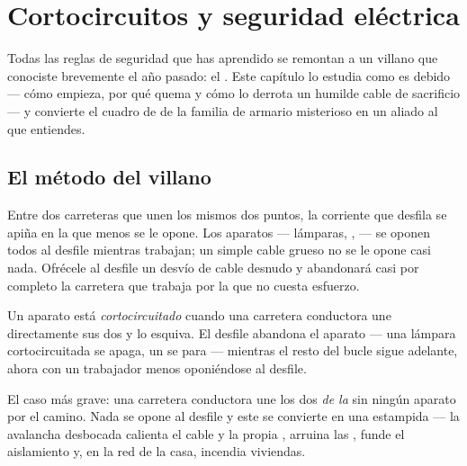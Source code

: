 \chapter{Cortocircuitos y seguridad eléctrica}\label{ch:g7:short-circuits-safety}

Todas las reglas de seguridad que has aprendido se remontan a un
villano que conociste brevemente el año pasado: el
. Este capítulo lo estudia como es debido --- cómo
empieza, por qué quema y cómo lo derrota un humilde cable de
sacrificio --- y convierte el cuadro de  de la familia de
armario misterioso en un aliado al que entiendes.

\section{El método del villano}

\begin{proposition}\label{prop:g7:short-circuits-safety:effortless}
Entre dos carreteras que unen los mismos dos puntos, la corriente que
desfila se apiña en la que menos se le opone. Los aparatos ---
lámparas, ,  --- se oponen todos al desfile
mientras trabajan; un simple cable grueso no se le opone casi nada.
Ofrécele al desfile un desvío de cable desnudo y abandonará casi por
completo la carretera que trabaja por la que no cuesta esfuerzo.
\end{proposition}

\begin{definition}\label{def:g7:short-circuits-safety:device}
Un aparato está \emph{cortocircuitado} cuando una
carretera conductora une directamente sus dos  y lo esquiva.
El desfile abandona el aparato --- una lámpara cortocircuitada se
apaga, un  se para --- mientras el resto del bucle sigue
adelante, ahora con un trabajador menos oponiéndose al desfile.
\end{definition}

\begin{definition}\label{def:g7:short-circuits-safety:battery}
El caso más grave: una carretera conductora une los dos 
\emph{de la } sin ningún aparato por el camino. Nada se opone al
desfile y este se convierte en una estampida --- la avalancha
desbocada calienta el cable y la propia , arruina las
, funde el aislamiento y, en la red de la casa, incendia
viviendas.
\end{definition}

